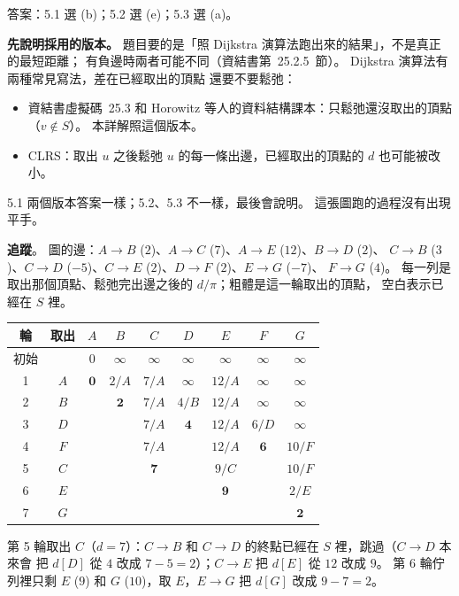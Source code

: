 \begin{pastsoln}
答案：5.1 選 (b)；5.2 選 (e)；5.3 選 (a)。

\textbf{先說明採用的版本。} 題目要的是「照 Dijkstra 演算法跑出來的結果」，不是真正的最短距離；
有負邊時兩者可能不同（資結書第~25.2.5~節）。 Dijkstra 演算法有兩種常見寫法，差在已經取出的頂點
還要不要鬆弛：
\begin{itemize}
\item 資結書虛擬碼~25.3 和 Horowitz 等人的資料結構課本：只鬆弛還沒取出的頂點（$v \notin S$）。
本詳解照這個版本。
\item CLRS：取出 $u$ 之後鬆弛 $u$ 的每一條出邊，已經取出的頂點的 $d$ 也可能被改小。
\end{itemize}
5.1 兩個版本答案一樣；5.2、5.3 不一樣，最後會說明。 這張圖跑的過程沒有出現平手。

\textbf{追蹤}。 圖的邊：$A \to B$ ($2$)、$A \to C$ ($7$)、$A \to E$ ($12$)、$B \to D$ ($2$)、
$C \to B$ ($3$)、$C \to D$ ($-5$)、$C \to E$ ($2$)、$D \to F$ ($2$)、$E \to G$ ($-7$)、
$F \to G$ ($4$)。 每一列是取出那個頂點、鬆弛完出邊之後的 $d/\pi$；粗體是這一輪取出的頂點，
空白表示已經在 $S$ 裡。

\begin{center}
\small
\begin{tabular}{cc*{7}{c}}
\toprule
輪 & 取出 & $A$ & $B$ & $C$ & $D$ & $E$ & $F$ & $G$ \\
\midrule
初始 & & $0$ & $\infty$ & $\infty$ & $\infty$ & $\infty$ & $\infty$ & $\infty$ \\
1 & $A$ & $\mathbf{0}$ & $2/A$ & $7/A$ & $\infty$ & $12/A$ & $\infty$ & $\infty$ \\
2 & $B$ & & $\mathbf{2}$ & $7/A$ & $4/B$ & $12/A$ & $\infty$ & $\infty$ \\
3 & $D$ & & & $7/A$ & $\mathbf{4}$ & $12/A$ & $6/D$ & $\infty$ \\
4 & $F$ & & & $7/A$ & & $12/A$ & $\mathbf{6}$ & $10/F$ \\
5 & $C$ & & & $\mathbf{7}$ & & $9/C$ & & $10/F$ \\
6 & $E$ & & & & & $\mathbf{9}$ & & $2/E$ \\
7 & $G$ & & & & & & & $\mathbf{2}$ \\
\bottomrule
\end{tabular}
\end{center}

第 5 輪取出 $C$（$d = 7$）：$C \to B$ 和 $C \to D$ 的終點已經在 $S$ 裡，跳過（$C \to D$ 本來會
把 $d[D]$ 從 $4$ 改成 $7 - 5 = 2$）；$C \to E$ 把 $d[E]$ 從 $12$ 改成 $9$。 第 6 輪佇列裡只剩
$E$ ($9$) 和 $G$ ($10$)，取 $E$，$E \to G$ 把 $d[G]$ 改成 $9 - 7 = 2$。


\end{pastsoln}
